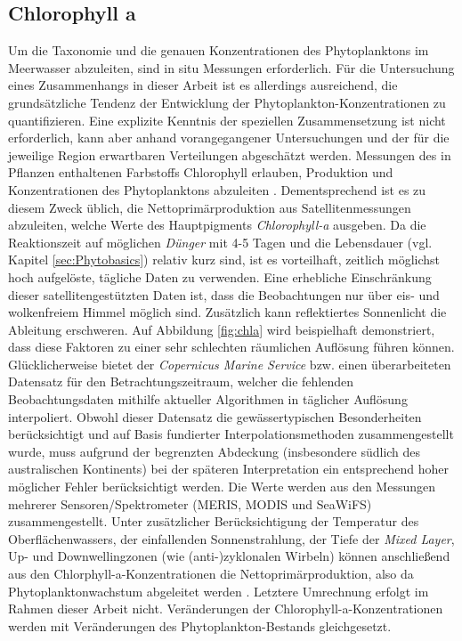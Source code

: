 \documentclass[12pt,a4paper,onecolumn,headheight=30pt]{scrartcl}
\begin{document}
\subsection{Chlorophyll a} \label{sec:chla}
Um die Taxonomie und die genauen Konzentrationen des Phytoplanktons im Meerwasser abzuleiten, sind in situ Messungen erforderlich. Für die Untersuchung eines Zusammenhangs in dieser Arbeit ist es allerdings ausreichend, die grundsätzliche Tendenz der Entwicklung der Phytoplankton-Konzentrationen zu quantifizieren. Eine explizite Kenntnis der speziellen Zusammensetzung ist nicht erforderlich, kann aber anhand vorangegangener Untersuchungen und der für die jeweilige Region erwartbaren Verteilungen abgeschätzt werden. Messungen des in Pflanzen enthaltenen Farbstoffs Chlorophyll erlauben, Produktion und Konzentrationen des Phytoplanktons abzuleiten \citep{RYTHER.1957}. Dementsprechend ist es zu diesem Zweck üblich, die Nettoprimärproduktion aus Satellitenmessungen abzuleiten, welche Werte des Hauptpigments \textit{Chlorophyll-a} ausgeben. Da die Reaktionszeit auf möglichen \textit{Dünger} mit 4-5 Tagen und die Lebensdauer (vgl. Kapitel \ref{sec:Phytobasics}) relativ kurz sind, ist es vorteilhaft, zeitlich möglichst hoch aufgelöste, tägliche Daten zu verwenden. Eine erhebliche Einschränkung dieser satellitengestützten Daten ist, dass die Beobachtungen nur über eis- und wolkenfreiem Himmel möglich sind. Zusätzlich kann reflektiertes Sonnenlicht die Ableitung erschweren. Auf Abbildung \ref{fig:chla} wird beispielhaft demonstriert, dass diese Faktoren zu einer sehr schlechten räumlichen Auflösung führen können. Glücklicherweise bietet der \textit{Copernicus Marine Service} bzw. \citet{Saulquin.2019} einen überarbeiteten Datensatz für den Betrachtungszeitraum, welcher die fehlenden Beobachtungsdaten mithilfe aktueller Algorithmen in täglicher Auflösung interpoliert. Obwohl dieser Datensatz die gewässertypischen Besonderheiten berücksichtigt und auf Basis fundierter Interpolationsmethoden zusammengestellt wurde, muss aufgrund der begrenzten Abdeckung (insbesondere südlich des australischen Kontinents) bei der späteren Interpretation ein entsprechend hoher möglicher Fehler berücksichtigt werden. Die Werte werden aus den Messungen mehrerer Sensoren/Spektrometer (MERIS, MODIS und SeaWiFS) zusammengestellt. Unter zusätzlicher Berücksichtigung der Temperatur des Oberflächenwassers, der einfallenden Sonnenstrahlung, der Tiefe der \textit{Mixed Layer}, Up- und Downwellingzonen (wie (anti-)zyklonalen Wirbeln) können anschließend aus den Chlorphyll-a-Konzentrationen die Nettoprimärproduktion, also da Phytoplanktonwachstum abgeleitet werden \citep{Falkowski.1998}. Letztere Umrechnung erfolgt im Rahmen dieser Arbeit nicht. Veränderungen der Chlorophyll-a-Konzentrationen werden mit Veränderungen des Phytoplankton-Bestands gleichgesetzt.
\end{document}

